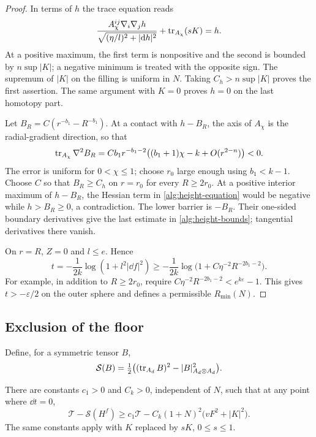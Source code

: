 \begin{proof}
In terms of $h$ the trace equation reads
\begin{equation}
 \frac{A_\chi^{ij}\nabla_i\nabla_jh}
 {\sqrt{(\eta/l)^2+|\mathrm d h|^2}}+\operatorname{tr}_{A_\chi}(sK)=h.
 \label{alg:height-equation}
\end{equation}
At a positive maximum, the first term is nonpositive and the second is
bounded by $n\sup|K|$; a negative minimum is treated with the opposite
sign.  The supremum of $|K|$ on the filling is uniform in $N$.
Taking $C_h>n\sup|K|$ proves the first assertion.  The same argument
with $K=0$ proves $h=0$ on the last homotopy part.

Let $B_R=C(r^{-b_1}-R^{-b_1})$.  At a contact with $h-B_R$, the
axis of $A_\chi$ is the radial-gradient direction, so that
\[
 \operatorname{tr}_{A_\chi}\nabla^2B_R
 =Cb_1r^{-b_1-2}
   \bigl((b_1+1)\chi-k+O(r^{2-n})\bigr)<0.
\]
The error is uniform for $0<\chi\leq1$; choose $r_0$ large enough
using $b_1<k-1$.  Choose $C$ so that $B_R\geq C_h$ on $r=r_0$
for every $R\geq2r_0$.  At a positive interior maximum of $h-B_R$,
the Hessian term in \eqref{alg:height-equation} would be negative
while $h>B_R\geq0$, a contradiction.  The lower barrier is $-B_R$.
Their one-sided boundary derivatives give the last estimate in
\eqref{alg:height-bounds}; tangential derivatives there vanish.

On $r=R$, $Z=0$ and $l\leq e$.  Hence
\[
 t=-\frac{1}{2k}\log(1+l^2|\dd f|^2)
 \geq-\frac{1}{2k}\log\bigl(1+C\eta^{-2}R^{-2b_1-2}\bigr).
\]
For example, in addition to $R\geq2r_0$, require
$C\eta^{-2}R^{-2b_1-2}<e^{k\varepsilon}-1$.
This gives $t>-\varepsilon/2$ on the outer sphere and defines a
permissible $R_{\min}(N)$.
\end{proof}

\subsection{Exclusion of the floor}

Define, for a symmetric tensor $B$,
\[
 \mathcal S(B)=\tfrac12\bigl((\operatorname{tr}_{A_d}B)^2
                         -|B|_{A_d\otimes A_d}^2\bigr).
\]

\begin{lemma}
\label{alg:floor-algebra}
There are constants $c_1>0$ and $C_k>0$, independent of $N$, such
that at any point where $\dd t=0$,
\begin{equation}
 \mathcal T-\mathcal S(H^f)
 \geq c_1\mathcal T
        -C_k(1+N)^2\bigl(vF^2+|K|^2\bigr).
 \label{alg:floor-quadratic}
\end{equation}
The same constants apply with $K$ replaced by $sK$, $0\leq s\leq1$.
\end{lemma}

